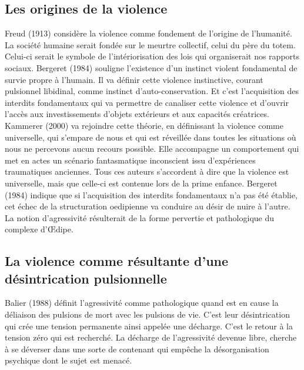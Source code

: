 \documentclass[12pt, a4paper]{book}
\begin{document}
\begin{spacing}{1.5}
\subsection{Les origines de la violence}

Freud (1913) considère la violence comme fondement de l'origine de l'humanité. La société humaine serait fondée sur le meurtre collectif, celui du père du totem. Celui-ci serait le symbole de l'intériorisation des lois qui organiserait nos rapports sociaux. Bergeret (1984) souligne l'existence d'un instinct violent fondamental de survie propre à l'humain. Il va définir cette violence instinctive, courant pulsionnel libidinal, comme instinct d'auto-conservation. Et c'est l'acquisition des interdits fondamentaux qui va permettre de canaliser cette violence et d'ouvrir l'accès aux investissements d'objets extérieurs et aux capacités créatrices. Kammerer (2000) va rejoindre cette théorie, en définissant la violence comme universelle, qui s'empare de nous et qui est réveillée dans toutes les situations où nous ne percevons aucun recours possible. Elle accompagne un comportement qui met en actes un scénario fantasmatique inconscient issu d'expériences traumatiques anciennes. Tous ces auteurs s'accordent à dire que la violence est universelle, mais que celle-ci est contenue lors de la prime enfance. Bergeret (1984) indique que si l'acquisition des interdits fondamentaux n'a pas été établie, cet échec de la structuration oedipienne va conduire au désir de nuire à l'autre. La notion d'agressivité résulterait de la forme pervertie et pathologique du complexe d'Œdipe. 

\subsection{La violence comme résultante d'une désintrication pulsionnelle}

Balier (1988) définit l'agressivité comme pathologique quand est en cause la déliaison des pulsions de mort avec les pulsions de vie. C'est leur désintrication qui crée une tension permanente ainsi appelée une décharge. C'est le retour à la tension zéro qui est recherché. La décharge de l'agressivité devenue libre, cherche à se déverser dans une sorte de contenant qui empêche la désorganisation psychique dont le sujet est menacé.


\end{spacing}
\end{document}
